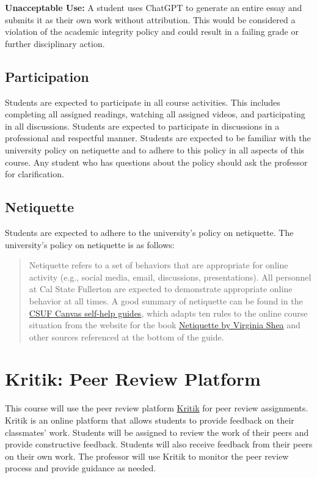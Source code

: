 \documentclass[12pt, letterpaper]{article}
\begin{document}
\vspace{1ex}

\noindent\textbf{Unacceptable Use:} A student uses ChatGPT to generate an entire essay and submits it as their own work without attribution. This would be considered a violation of the academic integrity policy and could result in a failing grade or further disciplinary action.

\subsection*{Participation}

Students are expected to participate in all course activities. This includes completing all assigned readings, watching all assigned videos, and participating in all discussions. Students are expected to participate in discussions in a professional and respectful manner. Students are expected to be familiar with the university policy on netiquette and to adhere to this policy in all aspects of this course. Any student who has questions about the policy should ask the professor for clarification. 

\subsection*{Netiquette}
Students are expected to adhere to the university's policy on netiquette. The university's policy on netiquette is as follows:
\begin{quote}Netiquette refers to a set of behaviors that are appropriate for online activity (e.g., social media, email, discussions, presentations). All personnel at Cal State Fullerton are expected to demonstrate appropriate online behavior at all times. A good summary of netiquette can be found in the \href{https://canvashelp.fullerton.edu/m/Student/l/1336786-student-what-is-netiquette}{CSUF Canvas self-help guides}, which adapts ten rules to the online course situation from the website for the book \href{http://www.albion.com/netiquette/corerules.html}{Netiquette by Virginia Shea} and other sources referenced at the bottom of the guide.\end{quote}


\section{Kritik: Peer Review Platform}

\noindent This course will use the peer review platform \href{https://kritik.io/}{Kritik} for peer review assignments. Kritik is an online platform that allows students to provide feedback on their classmates' work. Students will be assigned to review the work of their peers and provide constructive feedback. Students will also receive feedback from their peers on their own work. The professor will use Kritik to monitor the peer review process and provide guidance as needed.
\end{document}
